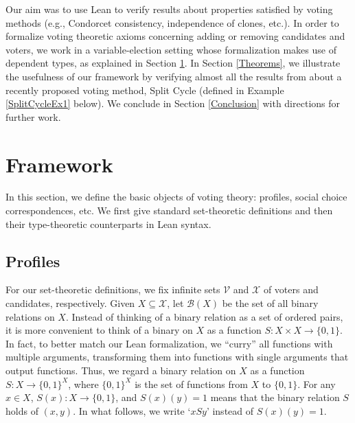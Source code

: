 \documentclass[runningheads]{llncs}
\begin{document}
Our aim was to use Lean to verify results about properties satisfied by voting methods (e.g., Condorcet consistency, independence of clones, etc.). In order to formalize voting theoretic axioms concerning adding or removing candidates and voters, we work in a variable-election setting whose formalization makes use of dependent types, as explained in Section \ref{Framework}.  In Section \ref{Theorems}, we illustrate the usefulness  of our  framework by verifying almost all the results from \cite{HP2020} about a recently proposed voting method, Split Cycle (defined in Example \ref{SplitCycleEx1} below). We conclude in Section \ref{Conclusion} with directions for further work.



 
\section{Framework}\label{Framework}

In this section, we define the basic objects of voting theory: profiles, social choice correspondences, etc. We first give standard set-theoretic definitions and then their type-theoretic counterparts in Lean syntax.

\subsection{Profiles}

For our set-theoretic definitions, we fix infinite sets $\mathcal{V}$ and $\mathcal{X}$ of voters and candidates, respectively. Given $X\subseteq\mathcal{X}$, let $\mathcal{B}(X)$ be the set of all binary relations on $X$. Instead of thinking of a binary relation as a set of ordered pairs, it is more convenient to think of a binary on $X$ as a function $S: X\times X \to \{0,1\}$. In fact, to better match our Lean formalization, we ``curry'' all functions with multiple arguments, transforming them into functions with single arguments that output functions. Thus, we regard a binary relation on $X$ as a function  $S:X\to \{0,1\}^X$, where $\{0,1\}^X$ is the set of functions from $X$ to $\{0,1\}$. For any $x\in X$, $S(x): X\to \{0,1\}$, and $S(x)(y)=1$ means that the binary relation $S$ holds of $(x,y)$. In what follows, we write `$xSy$' instead of $S(x)(y)=1$.

\end{document}
